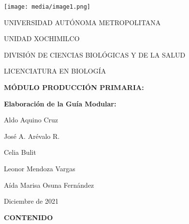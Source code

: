 \documentclass[
]{article}
\author{}
\date{\vspace{-2.5em}}
\begin{document}
\texttt{[image: media/image1.png]}

UNIVERSIDAD AUTÓNOMA METROPOLITANA

UNIDAD XOCHIMILCO

DIVISIÓN DE CIENCIAS BIOLÓGICAS Y DE LA SALUD

LICENCIATURA EN BIOLOGÍA

\textbf{MÓDULO PRODUCCIÓN PRIMARIA:}

\textbf{Elaboración de la Guía Modular:}

Aldo Aquino Cruz

José A. Arévalo R.

Celia Bulit

Leonor Mendoza Vargas

Aída Marisa Osuna Fernández

Diciembre de 2021

\textbf{CONTENIDO}
\end{document}
